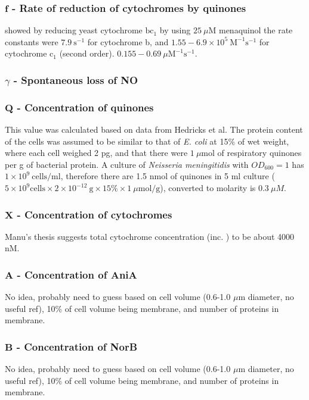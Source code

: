 \subsubsection*{$\mathbf{f}$ {\bf- Rate of reduction of cytochromes by quinones}}
\citet{Snyder2000} showed by reducing yeast cytochrome $\mathrm{bc}_1$ by using $25~\mu\mathrm{M}$ menaquinol the rate constants were $7.9~\mathrm{s}^{-1}$ for cytochrome b, and $1.55-6.9\times10^5~\mathrm{M}^{-1}\mathrm{s}^{-1}$ for cytochrome $\mathrm{c}_1$ (second order). $0.155 - 0.69~\mu\mathrm{M}^{-1}\mathrm{s}^{-1}$.

\subsubsection*{$\gamma$ {\bf- Spontaneous loss of NO}}


\subsubsection*{$\mathbf{Q}$ {\bf- Concentration of quinones}}
This value was calculated based on data from Hedricks et al\cite{Hedrick1986}. The protein content of the cells was assumed to be similar to that of \textit{E. coli} at 15\% of wet weight, where each cell weighed 2 pg, and that there were $1~\mu \textrm{mol}$ of respiratory quinones per g of bacterial protein. A culture of \textit{Neisseria meningitidis} with $OD_{600} = 1$ has $1 \times 10^9~\textrm{cells/ml}$, therefore there are 1.5 nmol of quinones in 5 ml culture ($5\times 10^9 \textrm{cells} \times 2\times 10^{-12}~\textrm{g} \times 15\% \times 1~\mu\textrm{mol/g}$), converted to molarity is $0.3~\mu M$.

\subsubsection*{$\mathbf{X}$ {\bf- Concentration of cytochromes}}
Manu's thesis\cite{Deeudom2007} suggests total cytochrome concentration (inc. \cbbthree{}) to be about 4000 nM.

\subsubsection*{$\mathbf{A}$ {\bf- Concentration of AniA}}
No idea, probably need to guess based on cell volume (0.6-1.0 $\mu$m diameter, no useful ref), 10\% of cell volume being membrane, and number of proteins in membrane.

\subsubsection*{$\mathbf{B}$ {\bf- Concentration of NorB}}
No idea, probably need to guess based on cell volume (0.6-1.0 $\mu$m diameter, no useful ref), 10\% of cell volume being membrane, and number of proteins in membrane.

